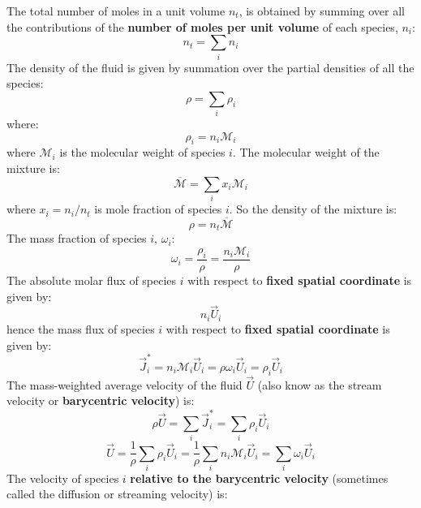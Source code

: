 \noindent
The total number of moles in a unit volume $n_t$, is obtained by summing over all the contributions of the \textbf{number of moles per unit volume} of each species, $n_i$:
\begin{equation}
n_t = \sum_i n_i
\end{equation}
The density of the fluid is given by summation over the partial densities of all the species:
\begin{equation}
\rho = \sum_i \rho_i
\end{equation}
where:
\begin{equation}
\rho_i = n_i \mathcal{M}_i
\end{equation}
where $\mathcal{M}_i$ is the molecular weight of species $i$.  The molecular weight of the mixture is:
\begin{equation}
\overline{\mathcal{M}} = \sum_i x_i \mathcal{M}_i
\end{equation}
where $x_i=n_i/n_t$ is mole fraction of species $i$.  So the density of the mixture is:
\begin{equation}
\rho = n_t \overline{\mathcal{M}}
\end{equation}
The mass fraction of species $i$, $\omega_i$:
\begin{equation}
\omega_i = \frac{\rho_i}{\rho} = \frac{n_i \mathcal{M}_i}{\rho}
\label{eq:rhoi}
\end{equation}
The absolute molar flux of species $i$ with respect to \textbf{fixed spatial coordinate} is given by:
\begin{equation}
n_i \vec{U}_i
\end{equation}
hence the mass flux of species $i$ with respect to \textbf{fixed spatial coordinate} is given by:
\begin{equation}
\vec{J}^\ast_i = n_i \mathcal{M}_i \vec{U}_i = \rho \omega_i \vec{U}_i = \rho_i \vec{U}_i
\label{eq:Jast}
\end{equation}
The mass-weighted average velocity of the fluid $\vec{U}$ (also know as the stream velocity or \textbf{barycentric velocity}) is:
\begin{equation}
\rho \vec{U} = \sum_i \vec{J}^\ast_i = \sum_i \rho_i \vec{U}_i
\end{equation}
\begin{equation}
\vec{U} = \frac{1}{\rho} \sum_i \rho_i \vec{U}_i = \frac{1}{\rho} \sum_i n_i \mathcal{M}_i \vec{U}_i = \sum_i \omega_i \vec{U}_i
\label{eq:barycentric}
\end{equation}
The velocity of species $i$ \textbf{relative to the barycentric velocity} (sometimes called the diffusion or streaming velocity) is:
